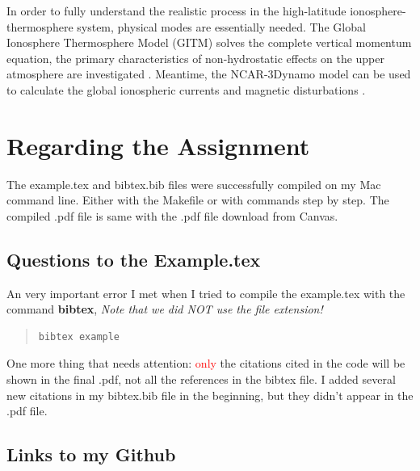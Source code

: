 \documentclass[12pt, letterpaper]{article} %
\begin{document}
In order to fully understand the realistic process in the high-latitude ionosphere-
thermosphere system, physical modes are essentially needed. The Global Ionosphere 
Thermosphere Model (GITM) solves the complete vertical momentum equation, the 
primary characteristics of non-hydrostatic effects on the upper atmosphere are 
investigated \cite[p. 13]{Deng2008}. Meantime, the NCAR-3Dynamo model can 
be used to calculate the global ionospheric currents and magnetic disturbations 
\citep[see][chap. 5]{Maute2017}.





\newpage %
\section{Regarding the Assignment} %

The example.tex and bibtex.bib files were successfully compiled on my Mac command line.
Either with the Makefile or with commands step by step. The compiled .pdf file is same with 
the .pdf file download from Canvas.

\subsection{Questions to the Example.tex} %

An very important error I met when I tried to compile the example.tex with 
the command \textbf{bibtex}, \emph{Note that we did NOT use the file extension!}  
\begin{quote}  %
\begin{verbatim}
bibtex example
\end{verbatim} %
\end{quote} %

One more thing that needs attention: \textcolor{red}{only} the citations 
cited in the code will be shown in the final .pdf, not all the references 
in the bibtex file. I added several new citations in my bibtex.bib file in 
the beginning, but they didn't appear in the .pdf file.

\subsection{Links to my Github} %
\end{document}
